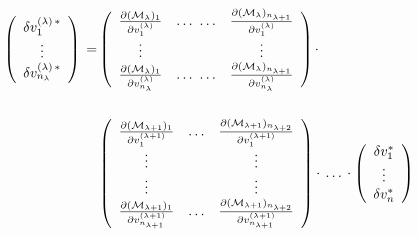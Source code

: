 {\small
\begin{equation}
\begin{aligned}
\left(
\begin{array}{c}
\delta v^{(\lambda) \, \ast}_1 \\
\vdots \\
\delta v^{(\lambda) \, \ast}_{n_{\lambda}} \\
\end{array}
\right)
\, = &
\left(
\begin{array}{ccc}
\frac{\partial ({\cal M}_{\lambda})_1}{\partial v^{(\lambda)}_1}
& \ldots \,\, \ldots &
\frac{\partial ({\cal M}_{\lambda})_{n_{\lambda+1}}}{\partial v^{(\lambda)}_1} \\
\vdots & ~ & \vdots \\
\frac{\partial ({\cal M}_{\lambda})_1}{\partial v^{(\lambda)}_{n_{\lambda}}}
& \ldots \,\, \ldots  &
\frac{\partial ({\cal M}_{\lambda})_{n_{\lambda+1}}}{\partial v^{(\lambda)}_{n_{\lambda}}} \\
\end{array}
\right)
\cdot
%
\\ ~ & ~
\\ ~ &
%
\left(
\begin{array}{ccc}
\frac{\partial ({\cal M}_{\lambda+1})_1}{\partial v^{(\lambda+1)}_1}
& \ldots &
\frac{\partial ({\cal M}_{\lambda+1})_{n_{\lambda+2}}}{\partial v^{(\lambda+1)}_1} \\
\vdots & ~ & \vdots \\
\vdots & ~ & \vdots \\
\frac{\partial ({\cal M}_{\lambda+1})_1}{\partial v^{(\lambda+1)}_{n_{\lambda+1}}}
& \ldots  &
\frac{\partial ({\cal M}_{\lambda+1})_{n_{\lambda+2}}}{\partial v^{(\lambda+1)}_{n_{\lambda+1}}} \\
\end{array}
\right)
\cdot \, \ldots \, \cdot
\left(
\begin{array}{c}
\delta v^{\ast}_1 \\
\vdots \\
\delta v^{\ast}_{n} \\
\end{array}
\right)
\end{aligned}
\end{equation}
}

